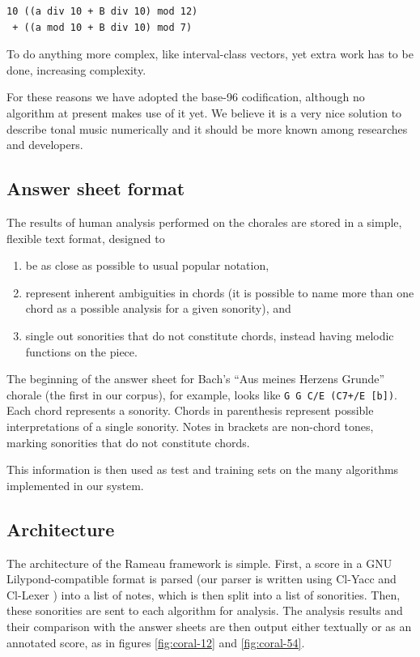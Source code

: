 \documentclass{article}
\begin{document}
\begin{verbatim}
10 ((a div 10 + B div 10) mod 12)
 + ((a mod 10 + B div 10) mod 7)
\end{verbatim}

To do anything more complex, like interval-class vectors, yet extra
work has to be done, increasing complexity.

For these reasons we have adopted the base-96 codification, although no
algorithm at present makes use of it yet. We believe it is a very nice
solution to describe tonal music numerically and it should be more
known among researches and developers.

\subsection{Answer sheet format}
\label{sec:formato-dos-acordes}

The results of human analysis performed on the chorales are stored in
a simple, flexible text format, designed to

\begin{enumerate}
\item be as close as possible to usual popular notation,
\item represent inherent ambiguities in chords (it is possible to name
  more than one chord as a possible analysis for a given sonority),
  and
\item single out sonorities that do not constitute chords, instead
  having melodic functions on the piece.
\end{enumerate}

The beginning of the answer sheet for Bach's ``Aus meines Herzens
Grunde'' chorale (the first in our corpus), for example, looks like
\texttt{G G C/E (C7+/E [b])}. Each chord represents a sonority. Chords
in parenthesis represent possible interpretations of a single
sonority. Notes in brackets are non-chord tones, marking sonorities
that do not constitute chords.

This information is then used as test and training sets on the many
algorithms implemented in our system.

\subsection{Architecture}
\label{sec:architecture-and-api}

The architecture of the Rameau framework is simple. First, a score in
a GNU Lilypond-compatible format is parsed (our parser is written
using Cl-Yacc \cite{chroboczek:_cl_yacc_manual} and Cl-Lexer
\cite{parker:_lexer_packag}) into a list of notes, which is then split
into a list of sonorities. Then, these sonorities are sent to each
algorithm for analysis. The analysis results and their comparison with
the answer sheets are then output either textually or as an annotated
score, as in figures \ref{fig:coral-12} and \ref{fig:coral-54}.
\end{document}
